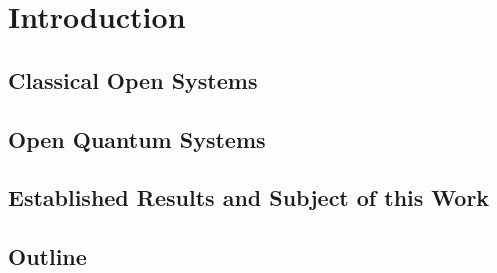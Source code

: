 \chapter{Introduction}
\label{chap:introduction}

\section{Classical Open Systems}
\label{sec:into.open_classical}


\section{Open Quantum Systems}
\label{sec:intro.open_quantum}


\section{Established Results and Subject of this Work}
\label{sec:into.results}


\section{Outline}
\label{sec:into.outline}

